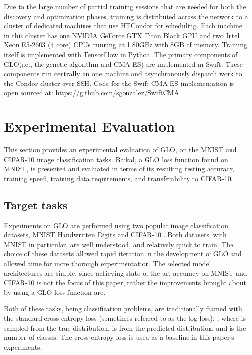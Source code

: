\documentclass[conference]{IEEEtran}
\newcommand{\TECH}{GLO\xspace}
\begin{document}
Due to the large number of partial training sessions that are needed for both the discovery and optimization phases, training is distributed across the network to a cluster of dedicated machines that use HTCondor \cite{condor} for scheduling. Each machine in this cluster has one NVIDIA GeForce GTX Titan Black GPU and two Intel Xeon E5-2603 (4 core) CPUs running at 1.80GHz with 8GB of memory. Training itself is implemented with TensorFlow \cite{tensorflow} in Python. The primary components of \TECH (i.e., the genetic algorithm and CMA-ES) are implemented in Swift. These components run centrally on one machine and asynchronously dispatch work to the Condor cluster over SSH. Code for the Swift CMA-ES implementation is open sourced at: \url{https://github.com/sgonzalez/SwiftCMA} 


\section{Experimental Evaluation}
\label{sec:exp_setup}

This section provides an experimental evaluation of \TECH, on the MNIST and CIFAR-10 image classification tasks. Baikal, a \TECH loss function found on MNIST, is presented and evaluated in terms of its resulting testing accuracy, training speed, training data requirements, and transferability to CIFAR-10.

\subsection{Target tasks}

Experiments on GLO are performed using two popular image classification datasets, MNIST Handwritten Digits \cite{mnist} and CIFAR-10 \cite{krizhevsky2009learning}. Both datasets, with MNIST in particular, are well understood, and relatively quick to train. The choice of these datasets allowed rapid iteration in the development of GLO and allowed time for more thorough experimentation. The selected model architectures are simple, since achieving state-of-the-art accuracy on MNIST and CIFAR-10 is not the focus of this paper, rather the improvements brought about by using a GLO loss function are.

Both of these tasks, being classification problems, are traditionally framed with the standard cross-entropy loss (sometimes referred to as the log loss): , where  is sampled from the true distribution,  is from the predicted distribution, and  is the number of classes. The cross-entropy loss is used as a baseline in this paper's experiments.
\end{document}
